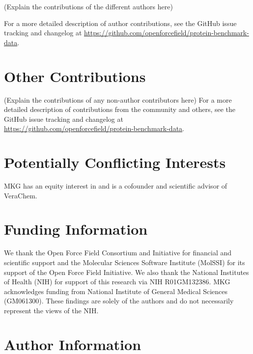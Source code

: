 \documentclass[9pt,review]{livecoms}
\newcommand{\githubrepository}{\url{https://github.com/openforcefield/protein-benchmark-data}}  %
\begin{document}
(Explain the contributions of the different authors here)

For a more detailed description of author contributions,
see the GitHub issue tracking and changelog at \githubrepository.

\section{Other Contributions}
%

(Explain the contributions of any non-author contributors here)
For a more detailed description of contributions from the community and others, see the GitHub issue tracking and changelog at \githubrepository.

\section{Potentially Conflicting Interests}

MKG has an equity interest in and is a cofounder and scientific advisor of VeraChem.

\section{Funding Information}
We thank the Open Force Field Consortium and Initiative for financial and scientific support and the Molecular Sciences Software Institute (MolSSI) for its support of the Open Force Field Initiative.
We also thank the National Institutes of Health (NIH) for support of this research via NIH R01GM132386.
MKG acknowledges funding from National Institute of General Medical Sciences (GM061300).
These findings are solely of the authors and do not necessarily represent the views of the NIH.

\section*{Author Information}
\makeorcid




\end{document}
